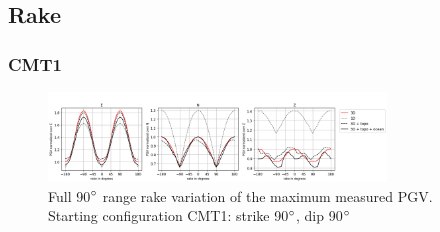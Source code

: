 \documentclass[../Text/00main.tex]{subfiles}
\begin{document}
\begin{figure}[htb!]
    \qquad
    \caption{}%
    \label{fig:dip_CMT2}%
\end{figure}



\FloatBarrier

\subsection{Rake}

\subsubsection{CMT1}

\begin{figure}[h!]
    \centering
    \includegraphics[width=0.8\textwidth]{images_results/fullrange_rakevar_maxvals_sc1.png}
    \caption{Full 90$\degree$ range rake variation of the maximum measured PGV. Starting configuration CMT1: strike 90$\degree$, dip 90$\degree$}
    \label{fig:fullrange_1_rake}
\end{figure}
\end{document}

